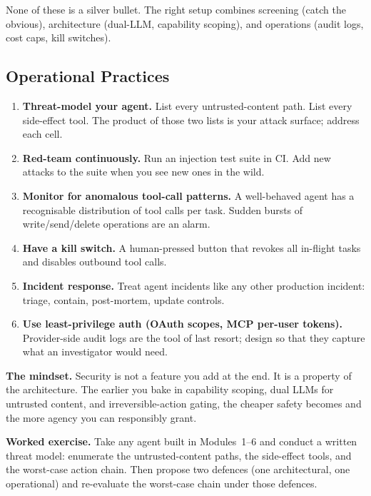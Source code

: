 \documentclass[a4paper,11pt]{article}
\begin{document}
None of these is a silver bullet. The right setup combines screening
(catch the obvious), architecture (dual-LLM, capability scoping),
and operations (audit logs, cost caps, kill switches).

\subsection{Operational Practices}

\begin{enumerate}[noitemsep, leftmargin=1.4em]
  \item \textbf{Threat-model your agent.} List every untrusted-content
        path. List every side-effect tool. The product of those two
        lists is your attack surface; address each cell.
  \item \textbf{Red-team continuously.} Run an injection test suite
        in CI. Add new attacks to the suite when you see new ones in
        the wild.
  \item \textbf{Monitor for anomalous tool-call patterns.} A
        well-behaved agent has a recognisable distribution of tool
        calls per task. Sudden bursts of write/send/delete operations
        are an alarm.
  \item \textbf{Have a kill switch.} A human-pressed button that
        revokes all in-flight tasks and disables outbound tool calls.
  \item \textbf{Incident response.} Treat agent incidents like any
        other production incident: triage, contain, post-mortem,
        update controls.
  \item \textbf{Use least-privilege auth (OAuth scopes, MCP per-user
        tokens).} Provider-side audit logs are the tool of last
        resort; design so that they capture what an investigator
        would need.
\end{enumerate}

\begin{ambercallout}
\textbf{The mindset.}
Security is not a feature you add at the end. It is a property of
the architecture. The earlier you bake in capability scoping, dual
LLMs for untrusted content, and irreversible-action gating, the
cheaper safety becomes and the more agency you can responsibly grant.
\end{ambercallout}

\begin{callout}
\textbf{Worked exercise.}
Take any agent built in Modules~1–6 and conduct a written threat
model: enumerate the untrusted-content paths, the
side-effect tools, and the worst-case action chain. Then propose
two defences (one architectural, one operational) and re-evaluate
the worst-case chain under those defences.
\end{callout}
\end{document}
